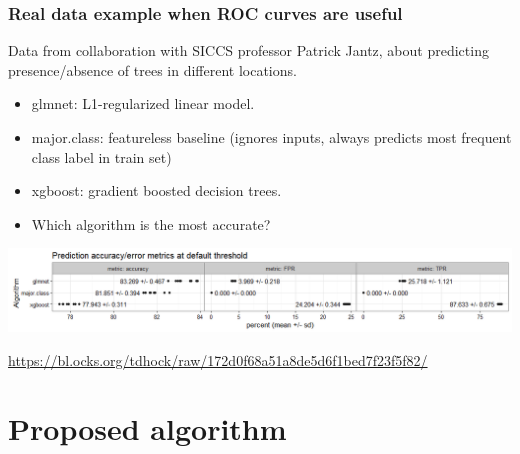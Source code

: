 \documentclass{beamer}
\begin{document}
\begin{frame}
  \frametitle{Real data example when ROC curves are useful}

  Data from collaboration with SICCS professor Patrick Jantz, about
  predicting presence/absence of trees in different locations.
  
  \begin{itemize}
  \item glmnet: L1-regularized linear model.
  \item major.class: featureless baseline (ignores inputs, always
    predicts most frequent class label in train set)
  \item xgboost: gradient boosted decision trees.
  \item Which algorithm is the most accurate?
  \end{itemize}
   
  \includegraphics[width=\textwidth]{figure-batchtools-expired-earth-metrics-default-Sugar-Maple.png}

  \url{https://bl.ocks.org/tdhock/raw/172d0f68a51a8de5d6f1bed7f23f5f82/}
  
\end{frame}

\section{Proposed algorithm}
\end{document}
